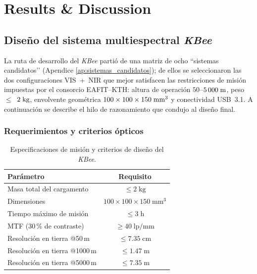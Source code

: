 \chapter{Results \& Discussion}         %

\section{Diseño del sistema multiespectral \textit{KBee}}

La ruta de desarrollo del \textit{KBee} partió de una matriz de ocho “sistemas   candidatos’’ (Apendice \ref{ap:sistemas_candidatos}); de ellos se seleccionaron las dos configuraciones VIS + NIR que mejor satisfacen las restricciones de misión impuestas por el consorcio
EAFIT–KTH: altura de operación $50$–$5\,000\;{\rm m}$, peso $\leq$ $2\;{\rm kg}$,
envolvente geométrica $100\times100\times150\;{\rm mm}^{3}$ y conectividad USB 3.1.
A continuación se describe el hilo de razonamiento que condujo al diseño final.

\subsection{Requerimientos y criterios ópticos}

\begin{table}[h]
    \centering
    \caption{Especificaciones de misión y criterios de diseño del \textit{KBee}.}
    \label{tab:req_vs_obj}
    \begin{tabular}{|p{4cm}|c|}
        \hline
        \rowcolor[HTML]{EFEFEF}\textbf{Parámetro} & \textbf{Requisito} \\ \hline
        Masa total del cargamento & $\leq 2\;\text{kg}$ \\ \hline
        Dimensiones & $100 \times 100 \times 150\;\text{mm}^{3}$ \\ \hline
        Tiempo máximo de misión & $\leq 3\;\text{h}$ \\ \hline
        MTF (30\,\% de contraste) & $\geq 40\;\text{lp/mm}$ \\ \hline
        Resolución en tierra @50\,m & $\leq 7.35\;\text{cm}$ \\ \hline
        Resolución en tierra @1000\,m & $\leq 1.47\;\text{m}$ \\ \hline
        Resolución en tierra @5000\,m & $\leq 7.35\;\text{m}$ \\ \hline
    \end{tabular}
\end{table}


